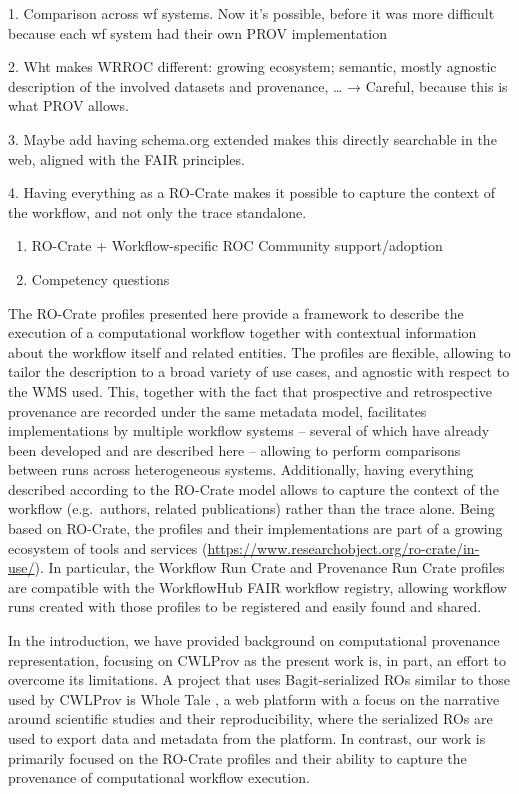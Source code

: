 \documentclass[10pt,letterpaper]{article}
\begin{document}

1.
Comparison across wf systems.
Now it's possible, before it was more difficult because each wf system had their own PROV implementation

2.
Wht makes WRROC different: growing ecosystem; semantic, mostly agnostic description of the involved datasets and provenance, \ldots{} →
Careful, because this is what PROV allows.

3.
Maybe add having schema.org extended makes this directly searchable in the web, aligned with the FAIR principles.

4.
Having everything as a RO-Crate makes it possible to capture the context of the workflow, and not only the trace standalone.

\begin{enumerate}
\item   RO-Crate + Workflow-specific ROC Community support/adoption
\item   Competency questions
\end{enumerate}

The RO-Crate profiles presented here provide a framework to describe the execution of a computational workflow together with contextual information about the workflow itself and related entities.
The profiles are flexible, allowing to tailor the description to a broad variety of use cases, and agnostic with respect to the WMS used.
This, together with the fact that prospective and retrospective provenance are recorded under the same metadata model, facilitates implementations by multiple workflow systems -- several of which have already been developed and are described here -- allowing to perform comparisons between runs across heterogeneous systems.
Additionally, having everything described according to the RO-Crate model allows to capture the context of the workflow (e.g.~authors, related publications) rather than the trace alone.
Being based on RO-Crate, the profiles and their implementations are part of a growing ecosystem of tools and services (\url{https://www.researchobject.org/ro-crate/in-use/}).
In particular, the Workflow Run Crate and Provenance Run Crate profiles are compatible with the WorkflowHub FAIR workflow registry, allowing workflow runs created with those profiles to be registered and easily found and shared.

In the introduction, we have provided background on computational provenance representation, focusing on CWLProv as the present work is, in part, an effort to overcome its limitations.
A project that uses Bagit-serialized ROs similar to those used by CWLProv is Whole Tale
\cite{Chard 2019}, a web platform with a focus on the narrative around scientific studies and their reproducibility, where the serialized ROs are used to export data and metadata from the platform.
In contrast, our work is primarily focused on the RO-Crate profiles and their ability to capture the provenance of computational workflow execution.
\end{document}
